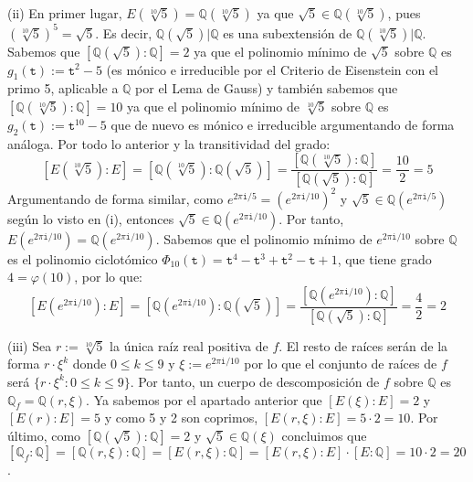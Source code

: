 (ii) En primer lugar, $E\left(\sqrt[10]{5}\right) = \mathbb{Q}\left(\sqrt[10]{5}\right)$ ya que $\sqrt{5}\in\mathbb{Q}\left(\sqrt[10]{5}\right)$, pues $\left(\sqrt[10]{5}\right)^5 = \sqrt{5}$. Es decir, $\mathbb{Q}\left(\sqrt{5}\right)|\mathbb{Q}$ es una subextensión de $\mathbb{Q}\left(\sqrt[10]{5}\right)|\mathbb{Q}$. Sabemos que $[\mathbb{Q}\left(\sqrt{5}\right):\mathbb{Q}] = 2$ ya que el polinomio mínimo de $\sqrt{5}$ sobre $\mathbb{Q}$ es $g_1\left(\mathtt{t}\right) := \mathtt{t}^2 - 5$ (es mónico e irreducible por el Criterio de Eisenstein con el primo 5, aplicable a $\mathbb{Q}$ por el Lema de Gauss) y también sabemos que $[\mathbb{Q}\left(\sqrt[10]{5}\right):\mathbb{Q}] = 10$ ya que el polinomio mínimo de $\sqrt[10]{5}$ sobre $\mathbb{Q}$ es $g_2\left(\mathtt{t}\right) := \mathtt{t}^{10} - 5$ que de nuevo es mónico e irreducible argumentando de forma análoga. Por todo lo anterior y la transitividad del grado:
$$[E(\sqrt[10]{5}):E] = [\mathbb{Q}(\sqrt[10]{5}):\mathbb{Q}(\sqrt{5})] = \frac{[\mathbb{Q}\left(\sqrt[10]{5}\right):\mathbb{Q}]}{[\mathbb{Q}\left(\sqrt{5}\right):\mathbb{Q}]} = \frac{10}{2} = 5$$
Argumentando de forma similar, como $e^{2\pi \mathtt{i}/5}=\left(e^{2\pi \mathtt{i}/10}\right)^{2}$ y $\sqrt{5}\in \mathbb{Q}\left(e^{2\pi \mathtt{i}/5}\right)$ según lo visto en (i), entonces $\sqrt{5}\in \mathbb{Q}\left(e^{2\pi \mathtt{i}/10}\right)$. Por tanto, $E\left(e^{2\pi \mathtt{i}/10}\right) = \mathbb{Q}\left(e^{2\pi \mathtt{i}/10}\right)$. Sabemos que el polinomio mínimo de $e^{2\pi \mathtt{i}/10}$ sobre $\mathbb{Q}$ es el polinomio ciclotómico $\Phi_{10}\left(\mathtt{t}\right) = \mathtt{t}^4-\mathtt{t}^3+\mathtt{t}^2-\mathtt{t}+1$, que tiene grado $4=\varphi(10)$, por lo que:
$$[E(e^{2\pi \mathtt{i}/10}):E] = [\mathbb{Q}(e^{2\pi \mathtt{i}/10}):\mathbb{Q}(\sqrt{5})] = \frac{[\mathbb{Q}(e^{2\pi \mathtt{i}/10}):\mathbb{Q}]}{[\mathbb{Q}(\sqrt{5}):\mathbb{Q}]} = \frac{4}{2} = 2$$

(iii) Sea $r:=\sqrt[10]{5}$ la única raíz real positiva de $f$. El resto de raíces serán de la forma $r\cdot\xi^{k}$ donde $0\leq k\leq 9$ y $\xi := e^{2\pi \mathtt{i}/10}$ por lo que el conjunto de raíces de $f$ será $\{r\cdot\xi^{k}: 0\leq k\leq 9\}$. Por tanto, un cuerpo de descomposición de $f$ sobre $\mathbb{Q}$ es $\mathbb{Q}_f = \mathbb{Q}\left(r,\xi\right)$. Ya sabemos por el apartado anterior que $[E\left(\xi\right):E] = 2$ y $[E\left(r\right):E] = 5$ y como 5 y 2 son coprimos, $[E\left(r,\xi\right):E]=5\cdot 2=10$. Por último, como $[\mathbb{Q}\left(\sqrt{5}\right):\mathbb{Q}] = 2$ y $\sqrt{5}\in \mathbb{Q}\left(\xi\right)$ concluimos que  $[\mathbb{Q}_f:\mathbb{Q}]=[\mathbb{Q}\left(r,\xi\right):\mathbb{Q}]=[E\left(r,\xi\right):\mathbb{Q}]=[E\left(r,\xi\right):E]\cdot[E:\mathbb{Q}]=10\cdot 2=20$.

